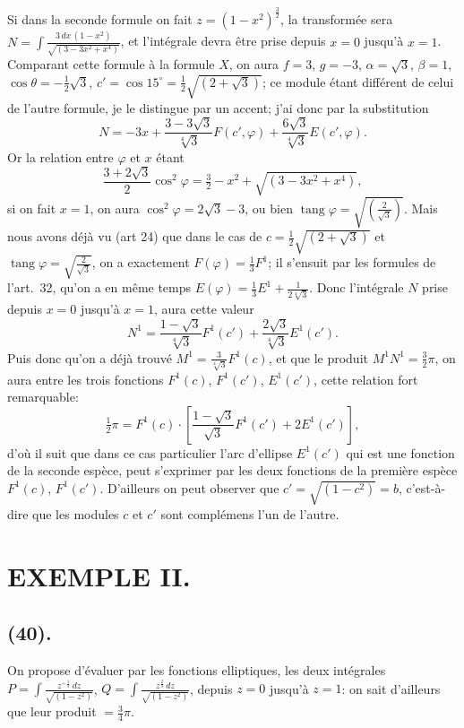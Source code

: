 \documentclass{article}
\begin{document}
Si dans la seconde formule on fait $z=(1-x^{2})^{\frac{3}{2}}$, la transformée sera $N=\displaystyle\int\frac{3\,dx\,(1-x^{2})}{\sqrt{(3-3x^{2}+x^{4})}}$, et l'intégrale devra être prise depuis $x=0$ jusqu'à $x=1$. Comparant cette formule à la formule $X$, on aura $f=3$, $g=-3$, $\alpha=\sqrt{3}$, $\beta=1$, $\cos\theta=-\frac{1}{2}\sqrt{3}$, $c'=\cos 15^{\circ}=\frac{1}{2}\sqrt{(2+\sqrt{3})}$; ce module étant différent de celui de l'autre formule, je le distingue par un accent; j'ai donc par la substitution
\[ N=-3x+\frac{3-3\sqrt{3}}{\sqrt[4]{3}}F(c',\varphi)+\frac{6\sqrt{3}}{\sqrt[4]{3}}E(c',\varphi). \]
Or la relation entre $\varphi$ et $x$ étant
\[ \frac{3+2\sqrt{3}}{2}\cos^{2}\varphi=\tfrac{3}{2}-x^{2}+\sqrt{(3-3x^{2}+x^{4})}, \]
si on fait $x=1$, on aura $\cos^{2}\varphi=2\sqrt{3}-3$, ou bien $\operatorname{tang}\varphi=\sqrt{\left(\frac{2}{\sqrt{3}}\right)}$. Mais nous avons déjà vu (art 24) que dans le cas de $c=\frac{1}{2}\sqrt{(2+\sqrt{3})}$ et $\operatorname{tang}\varphi=\sqrt{\frac{2}{\sqrt{3}}}$, on a exactement $F(\varphi)=\frac{1}{3}F^{1}$; il s'ensuit par les formules de l'art.~32, qu'on a en même temps $E(\varphi)=\frac{1}{3}E^{1}+\frac{1}{2\sqrt[4]{3}}$. Donc l'intégrale $N$ prise depuis $x=0$ jusqu'à $x=1$, aura cette valeur
\[ N^{1}=\frac{1-\sqrt{3}}{\sqrt[4]{3}}F^{1}(c')+\frac{2\sqrt{3}}{\sqrt[4]{3}}E^{1}(c'). \]
Puis donc qu'on a déjà trouvé $M^{1}=\frac{3}{\sqrt[4]{3}}F^{1}(c)$, et que le produit $M^{1}N^{1}=\frac{3}{2}\pi$, on aura entre les trois fonctions $F^{1}(c)$, $F^{1}(c')$, $E^{1}(c')$, cette relation fort remarquable:
\[ \tfrac{1}{2}\pi=F^{1}(c)\cdot\left[\frac{1-\sqrt{3}}{\sqrt{3}}F^{1}(c')+2E^{1}(c')\right], \]
d'où il suit que dans ce cas particulier l'arc d'ellipse $E^{1}(c')$ qui est une fonction de la seconde espèce, peut s'exprimer par les deux fonctions de la première espèce $F^{1}(c)$, $F^{1}(c')$. D'ailleurs on peut observer que $c'=\sqrt{(1-c^{2})}=b$, c'est-à-dire que les modules $c$ et $c'$ sont complémens l'un de l'autre.


\section*{EXEMPLE II.}

\subsection*{(40).}

On propose d'évaluer par les fonctions elliptiques, les deux intégrales $P=\displaystyle\int\frac{z^{-\frac{1}{3}}\,dz}{\sqrt{(1-z^{2})}}$, $Q=\displaystyle\int\frac{z^{\frac{2}{3}}\,dz}{\sqrt{(1-z^{2})}}$, depuis $z=0$ jusqu'à $z=1$: on sait d'ailleurs que leur produit $=\frac{3}{4}\pi$.
\end{document}
